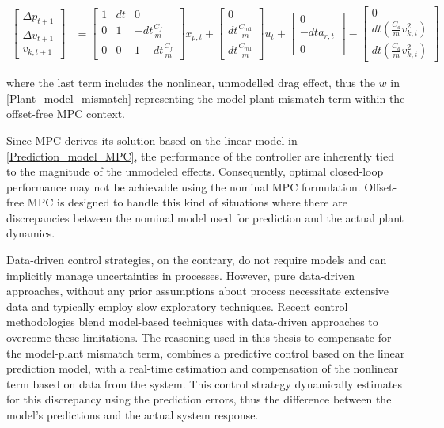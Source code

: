 \documentclass[a4paper,12pt,oneside]{book}
\begin{document}
\begin{equation}
\begin{aligned}
    \begin{bmatrix}
        \Delta p_{t+1}  \\
        \Delta v_{t+1} \\
        v_{k,t+1}
    \end{bmatrix}
    & =
    \begin{bmatrix}
        1 & dt & 0 \\
        0 & 1 & -dt\frac{C_f}{m} \\
        0 & 0 & 1-dt\frac{C_f}{m}
    \end{bmatrix}
    x_{p,t}
    +
    \begin{bmatrix}
        0 \\
        dt \frac{C_{m1}}{m} \\
        dt \frac{C_{m1}}{m}
    \end{bmatrix}
    u_t + 
    \begin{bmatrix}
    0 \\
    - dt a_{r,t} \\
    0
    \end{bmatrix} 
    -
    \begin{bmatrix}
    0 \\
    dt (\frac{C_{d}}{m} v_{k,t}^2) \\
    dt (\frac{C_{d}}{m} v_{k,t}^2)
    \end{bmatrix}
\end{aligned}
\label{Non-lin_prediction_model_MPC}
\end{equation}

where the last term includes the nonlinear, unmodelled drag effect, thus the $w$ in \ref{Plant_model_mismatch} representing the model-plant mismatch term within the offset-free MPC context.

\bigskip
Since MPC derives its solution based on the linear model in \ref{Prediction_model_MPC}, the performance of the controller are inherently tied to the magnitude of the unmodeled effects.
Consequently, optimal closed-loop performance may not be achievable using the nominal MPC formulation. 
Offset-free MPC is designed to handle this kind of situations where there are discrepancies between the nominal model used for prediction and the actual plant dynamics. 

\bigskip
Data-driven control strategies, on the contrary, do not require models and can implicitly manage uncertainties in processes. 
However, pure data-driven approaches, without any prior assumptions about process necessitate extensive data and typically employ slow exploratory techniques.
Recent control methodologies blend model-based techniques with data-driven approaches to overcome these limitations.
The reasoning used in this thesis to compensate for the model-plant mismatch term, combines a predictive control based on the linear prediction model, with a real-time estimation and compensation of the nonlinear term based on data from the system.
This control strategy dynamically estimates for this discrepancy using the prediction errors, thus the difference between the model's predictions and the actual system response.
\end{document}
